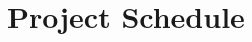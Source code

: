 \documentclass[\mainpath/main]{subfiles}
\begin{document}
	
\chapter{Project Schedule} %
\label{ProjectSchedule}

\setmyfancystyle
\end{document}
